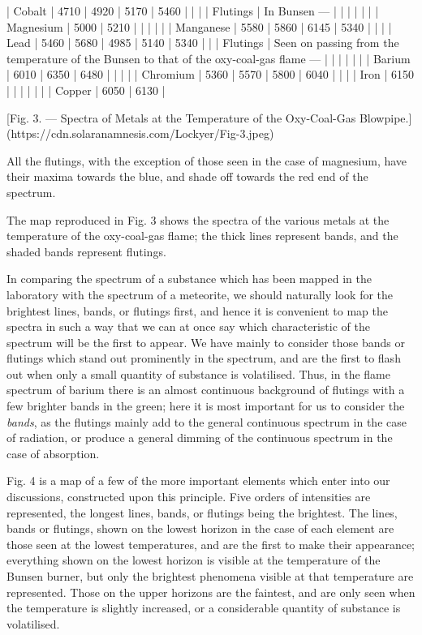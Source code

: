 \documentclass[a4paper, 12pt, oneside, polutonikogreek, english]{article}
\begin{document}
| Cobalt  | 4710                                           | 4920 | 5170 | 5460 |   |   |
| Flutings | In Bunsen ---                                      |   |   |   |   |   |
| Magnesium | 5000                                           | 5210 |   |   |   |   |
| Manganese | 5580                                           | 5860 | 6145 | 5340 |   |   |
| Lead   | 5460                                           | 5680 | 4985 | 5140 | 5340 |   |
| Flutings | Seen on passing from the temperature of the Bunsen to that of the oxy-coal-gas flame --- |   |   |   |   |   |
| Barium  | 6010                                           | 6350 | 6480 |   |   |   |
| Chromium | 5360                                           | 5570 | 5800 | 6040 |   |   |
| Iron   | 6150                                           |   |   |   |   |   |
| Copper  | 6050                                           | 6130 |

[Fig. 3. --- Spectra of Metals at the Temperature of the Oxy-Coal-Gas Blowpipe.](https://cdn.solaranamnesis.com/Lockyer/Fig-3.jpeg)

All the flutings, with the exception of those seen in the case of magnesium, have their maxima towards the blue, and shade off towards the red end of the spectrum.

The map reproduced in Fig. 3 shows the spectra of the various metals at the temperature of the oxy-coal-gas flame; the thick lines represent bands, and the shaded bands represent flutings.

In comparing the spectrum of a substance which has been mapped in the laboratory with the spectrum of a meteorite, we should naturally look for the brightest lines, bands, or flutings first, and hence it is convenient to map the spectra in such a way that we can at once say which characteristic of the spectrum will be the first to appear. We have mainly to consider those bands or flutings which stand out prominently in the spectrum, and are the first to flash out when only a small quantity of substance is volatilised. Thus, in the flame spectrum of barium there is an almost continuous background of flutings with a few brighter bands in the green; here it is most important for us to consider the \emph{bands}, as the flutings mainly add to the general continuous spectrum in the case of radiation, or produce a general dimming of the continuous spectrum in the case of absorption.

Fig. 4 is a map of a few of the more important elements which enter into our discussions, constructed upon this principle. Five orders of intensities are represented, the longest lines, bands, or flutings being the brightest. The lines, bands or flutings, shown on the lowest horizon in the case of each element are those seen at the lowest temperatures, and are the first to make their appearance; everything shown on the lowest horizon is visible at the temperature of the Bunsen burner, but only the brightest phenomena visible at that temperature are represented. Those on the upper horizons are the faintest, and are only seen when the temperature is slightly increased, or a considerable quantity of substance is volatilised.
\end{document}
